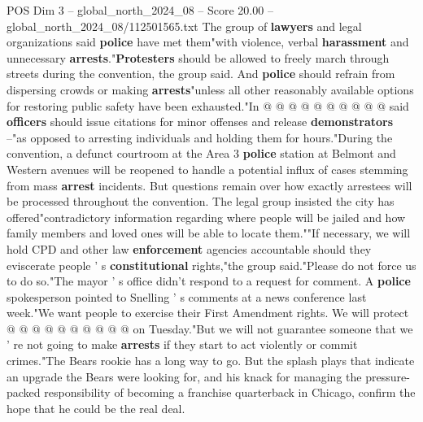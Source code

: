 \begin{textsample}{POS Dim 3 – global\_north\_2024\_08 – Score 20.00 – global\_north\_2024\_08/112501565.txt}
The group of \textbf{lawyers} and legal organizations said \textbf{police} have met them"with violence, verbal \textbf{harassment} and unnecessary \textbf{arrests}."\textbf{Protesters} should be allowed to freely march through streets during the convention, the group said.
And \textbf{police} should refrain from dispersing crowds or making \textbf{arrests}"unless all other reasonably available options for restoring public safety have been exhausted."In @ @ @ @ @ @ @ @ @ @ said \textbf{officers} should issue citations for minor offenses and release \textbf{demonstrators} --"as opposed to arresting individuals and holding them for hours."During the convention, a defunct courtroom at the Area 3 \textbf{police} station at Belmont and Western avenues will be reopened to handle a potential influx of cases stemming from mass \textbf{arrest} incidents.
But questions remain over how exactly arrestees will be processed throughout the convention.
The legal group insisted the city has offered"contradictory information regarding where people will be jailed and how family members and loved ones will be able to locate them.""If necessary, we will hold CPD and other law \textbf{enforcement} agencies accountable should they eviscerate people ' s \textbf{constitutional} rights,"the group said."Please do not force us to do so."The mayor ' s office didn't respond to a request for comment.
A \textbf{police} spokesperson pointed to Snelling ' s comments at a news conference last week."We want people to exercise their First Amendment rights.
We will protect @ @ @ @ @ @ @ @ @ @ on Tuesday."But we will not guarantee someone that we ' re not going to make \textbf{arrests} if they start to act violently or commit crimes."The Bears rookie has a long way to go.
But the splash plays that indicate an upgrade the Bears were looking for, and his knack for managing the pressure-packed responsibility of becoming a franchise quarterback in Chicago, confirm the hope that he could be the real deal.

\end{textsample}
